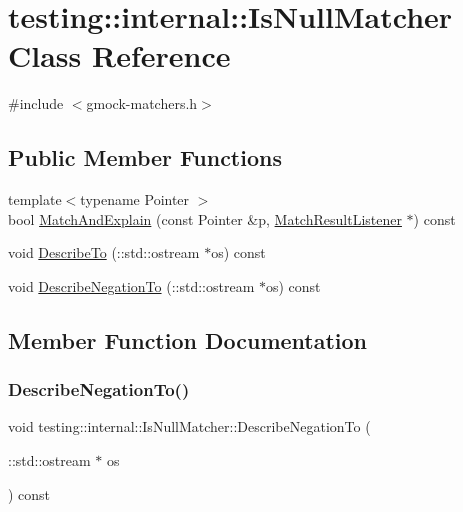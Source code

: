 \hypertarget{classtesting_1_1internal_1_1_is_null_matcher}{}\section{testing\+:\+:internal\+:\+:Is\+Null\+Matcher Class Reference}
\label{classtesting_1_1internal_1_1_is_null_matcher}


{\ttfamily \#include $<$gmock-\/matchers.\+h$>$}

\subsection*{Public Member Functions}
\begin{DoxyCompactItemize}
\item 
{\footnotesize template$<$typename Pointer $>$ }\\bool \hyperlink{classtesting_1_1internal_1_1_is_null_matcher_ab8a96a4389c9c352e367ba2edff6e87d}{Match\+And\+Explain} (const Pointer \&p, \hyperlink{classtesting_1_1_match_result_listener}{Match\+Result\+Listener} $\ast$) const
\item 
void \hyperlink{classtesting_1_1internal_1_1_is_null_matcher_a81c0b31d64bc65b5573bb56bbc3f4af8}{Describe\+To} (\+::std\+::ostream $\ast$os) const
\item 
void \hyperlink{classtesting_1_1internal_1_1_is_null_matcher_a8349e2d6cef08303be7f2471f330a7c0}{Describe\+Negation\+To} (\+::std\+::ostream $\ast$os) const
\end{DoxyCompactItemize}


\subsection{Member Function Documentation}
\mbox{\label{classtesting_1_1internal_1_1_is_null_matcher_a8349e2d6cef08303be7f2471f330a7c0}} 
\subsubsection{\texorpdfstring{Describe\+Negation\+To()}{DescribeNegationTo()}}
{\footnotesize\ttfamily void testing\+::internal\+::\+Is\+Null\+Matcher\+::\+Describe\+Negation\+To (\begin{DoxyParamCaption}\item[{\+::std\+::ostream $\ast$}]{os }\end{DoxyParamCaption}) const\hspace{0.3cm}{\ttfamily [inline]}}

